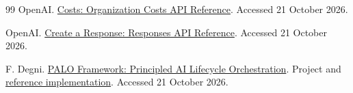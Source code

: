 \documentclass[10pt,twocolumn]{article}
\begin{document}
\begin{thebibliography}{99}
OpenAI. \href{https://developers.openai.com/api/reference/resources/admin/subresources/organization/subresources/usage/methods/costs}{Costs: Organization Costs API Reference}. Accessed 21 October 2026.

OpenAI. \href{https://developers.openai.com/api/reference/resources/responses/methods/create}{Create a Response: Responses API Reference}. Accessed 21 October 2026.

F. Degni. \href{https://paloframework.org/}{PALO Framework: Principled AI Lifecycle Orchestration}. Project and \href{https://github.com/sev7enITA/PALOframework}{reference implementation}. Accessed 21 October 2026.
\end{thebibliography}
\end{document}
